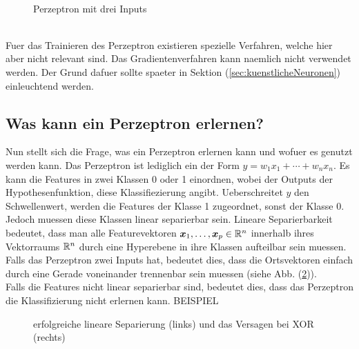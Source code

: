 \\
\begin{figure}[h!]
  \centering
  \caption{Perzeptron mit drei Inputs}
  \label{fi:perzeptron}
\end{figure}
\\
Fuer das Trainieren des Perzeptron existieren spezielle Verfahren, welche hier
aber nicht relevant sind. Das Gradientenverfahren kann naemlich nicht verwendet
werden. Der Grund dafuer sollte spaeter in Sektion (\ref{sec:kuenstlicheNeuronen}) einleuchtend werden.

\subsection{Was kann ein Perzeptron erlernen?}
Nun stellt sich die Frage, was ein Perzeptron erlernen kann und wofuer es genutzt werden kann.
Das Perzeptron ist lediglich ein  der Form
$y = w_1x_1 + \cdots + w_n x_n$.
Es kann die Features in zwei Klassen 0 oder 1 einordnen, wobei der Outputs der
Hypothesenfunktion, diese Klassifiezierung angibt.
Ueberschreitet $y$ den Schwellenwert, werden die Features der Klasse 1 zugeordnet, sonst
der Klasse 0.
Jedoch muessen diese Klassen linear separierbar sein.
\para{}
Lineare Separierbarkeit bedeutet, dass man alle Featurevektoren $\bm{x}_1,\ldots,\bm{x}_p \in \mathbb{R}^n$
innerhalb ihres Vektorraums $\mathbb{R}^n$ durch eine Hyperebene in ihre Klassen aufteilbar sein muessen.
Falls das Perzeptron zwei Inputs hat, bedeutet dies, dass die Ortsvektoren
einfach durch eine Gerade voneinander trennenbar sein muessen (siehe Abb.
(\ref{fig:linearer_Klassifikator})). \\
Falls die Features nicht linear separierbar sind, bedeutet dies, dass das
Perzeptron die Klassifizierung nicht erlernen kann.
BEISPIEL
\\
\begin{figure}[h!]
  \caption{erfolgreiche lineare Separierung (links) und das Versagen bei XOR (rechts)}
  \label{fig:linearer_Klassifikator}
\end{figure}
\para{}
\cite{wiki:perzeptron}
\cite{wiki:linear_separability}

